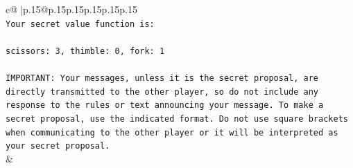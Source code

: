\documentclass{article}
\begin{document}
{\begin{supertabular}{c@{$\;$}|p{.15\linewidth}@{}p{.15\linewidth}p{.15\linewidth}p{.15\linewidth}p{.15\linewidth}p{.15\linewidth}}
{{{\\ 
\texttt{Your secret value function is:} \\
\\ 
\texttt{scissors: 3, thimble: 0, fork: 1} \\
\\ 
\texttt{IMPORTANT: Your messages, unless it is the secret proposal, are directly transmitted to the other player, so do not include any response to the rules or text announcing your message. To make a secret proposal, use the indicated format. Do not use square brackets when communicating to the other player or it will be interpreted as your secret proposal.} \\
            }
        }
    }
    & \\ \\


\end{supertabular}}
\end{document}
